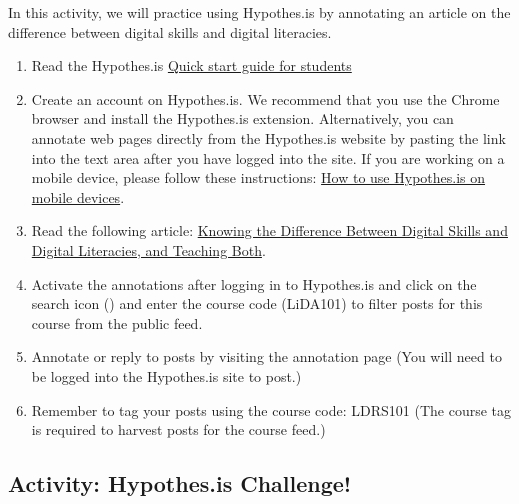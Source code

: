 \documentclass[
]{book}
\providecommand{\tightlist}{%
  \setlength{\itemsep}{0pt}\setlength{\parskip}{0pt}}
\theoremstyle{definition}
\theoremstyle{definition}
\theoremstyle{definition}
\theoremstyle{definition}
\theoremstyle{remark}
\begin{document}
\begin{reflect}
In this activity, we will practice using Hypothes.is by annotating an article on the difference between digital skills and digital literacies.

\begin{enumerate}
\def\labelenumi{\arabic{enumi}.}
\tightlist
\item
  Read the Hypothes.is \href{https://web.hypothes.is/quick-start-guide-for-students/}{Quick start guide for students}
\item
  Create an account on Hypothes.is. We recommend that you use the Chrome browser and install the Hypothes.is extension. Alternatively, you can annotate web pages directly from the Hypothes.is website by pasting the link into the text area after you have logged into the site. If you are working on a mobile device, please follow these instructions: \href{https://web.hypothes.is/help/how-to-use-hypothesis-on-mobile-devices/}{How to use Hypothes.is on mobile devices}.
\item
  Read the following article: \href{https://www.literacyworldwide.org/blog/literacy-now/2016/02/03/knowing-the-difference-between-digital-skills-and-digital-literacies-and-teaching-both}{Knowing the Difference Between Digital Skills and Digital Literacies, and Teaching Both}.\\
\item
  Activate the annotations after logging in to Hypothes.is and click on the search icon () and enter the course code (LiDA101) to filter posts for this course from the public feed.
\item
  Annotate or reply to posts by visiting the annotation page (You will need to be logged into the Hypothes.is site to post.)
\item
  Remember to tag your posts using the course code: LDRS101 (The course tag is required to harvest posts for the course feed.)
\end{enumerate}
\end{reflect}

\hypertarget{activity-hypothes.is-challenge}{%
\subsection*{Activity: Hypothes.is Challenge!}\label{activity-hypothes.is-challenge}}
\end{document}
